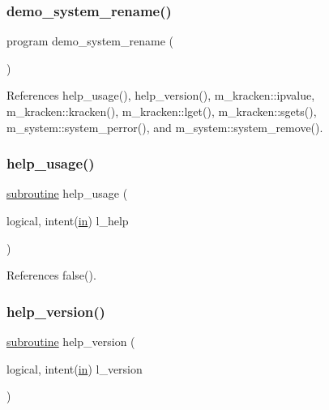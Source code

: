 \subsubsection{\texorpdfstring{demo\+\_\+system\+\_\+rename()}{demo\_system\_rename()}}
{\footnotesize\ttfamily program demo\+\_\+system\+\_\+rename (\begin{DoxyParamCaption}{ }\end{DoxyParamCaption})}



References help\+\_\+usage(), help\+\_\+version(), m\+\_\+kracken\+::ipvalue, m\+\_\+kracken\+::kracken(), m\+\_\+kracken\+::lget(), m\+\_\+kracken\+::sgets(), m\+\_\+system\+::system\+\_\+perror(), and m\+\_\+system\+::system\+\_\+remove().

\mbox{\label{__rm_8f90_a3e09a3b52ee8fb04eeb93fe5761626a8}} 
\subsubsection{\texorpdfstring{help\+\_\+usage()}{help\_usage()}}
{\footnotesize\ttfamily \hyperlink{M__stopwatch_83_8txt_acfbcff50169d691ff02d4a123ed70482}{subroutine} help\+\_\+usage (\begin{DoxyParamCaption}\item[{logical, intent(\hyperlink{M__journal_83_8txt_afce72651d1eed785a2132bee863b2f38}{in})}]{l\+\_\+help }\end{DoxyParamCaption})}



References false().

\mbox{\label{__rm_8f90_a39c21619b08a3c22f19e2306efd7f766}} 
\subsubsection{\texorpdfstring{help\+\_\+version()}{help\_version()}}
{\footnotesize\ttfamily \hyperlink{M__stopwatch_83_8txt_acfbcff50169d691ff02d4a123ed70482}{subroutine} help\+\_\+version (\begin{DoxyParamCaption}\item[{logical, intent(\hyperlink{M__journal_83_8txt_afce72651d1eed785a2132bee863b2f38}{in})}]{l\+\_\+version }\end{DoxyParamCaption})}



